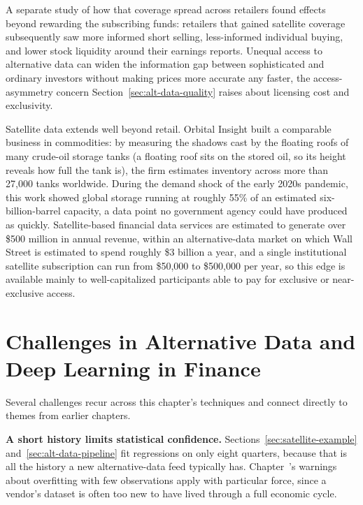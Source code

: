 \documentclass[../ai_in_finance]{subfiles}
\begin{document}
A separate study of how that coverage spread across retailers found effects beyond rewarding the subscribing funds: retailers that gained satellite coverage subsequently saw more informed short selling, less-informed individual buying, and lower stock liquidity around their earnings reports. Unequal access to alternative data can widen the information gap between sophisticated and ordinary investors without making prices more accurate any faster, the access-asymmetry concern Section~\ref{sec:alt-data-quality} raises about licensing cost and exclusivity.

Satellite data extends well beyond retail. Orbital Insight built a comparable business in commodities: by measuring the shadows cast by the floating roofs of many crude-oil storage tanks (a floating roof sits on the stored oil, so its height reveals how full the tank is), the firm estimates inventory across more than 27,000 tanks worldwide. During the demand shock of the early 2020s pandemic, this work showed global storage running at roughly 55\% of an estimated six-billion-barrel capacity, a data point no government agency could have produced as quickly. Satellite-based financial data services are estimated to generate over \$500 million in annual revenue, within an alternative-data market on which Wall Street is estimated to spend roughly \$3 billion a year, and a single institutional satellite subscription can run from \$50,000 to \$500,000 per year, so this edge is available mainly to well-capitalized participants able to pay for exclusive or near-exclusive access.

\section{Challenges in Alternative Data and Deep Learning in Finance}

Several challenges recur across this chapter's techniques and connect directly to themes from earlier chapters.

\textbf{A short history limits statistical confidence.} Sections~\ref{sec:satellite-example} and~\ref{sec:alt-data-pipeline} fit regressions on only eight quarters, because that is all the history a new alternative-data feed typically has. Chapter~'s warnings about overfitting with few observations apply with particular force, since a vendor's dataset is often too new to have lived through a full economic cycle.
\end{document}
